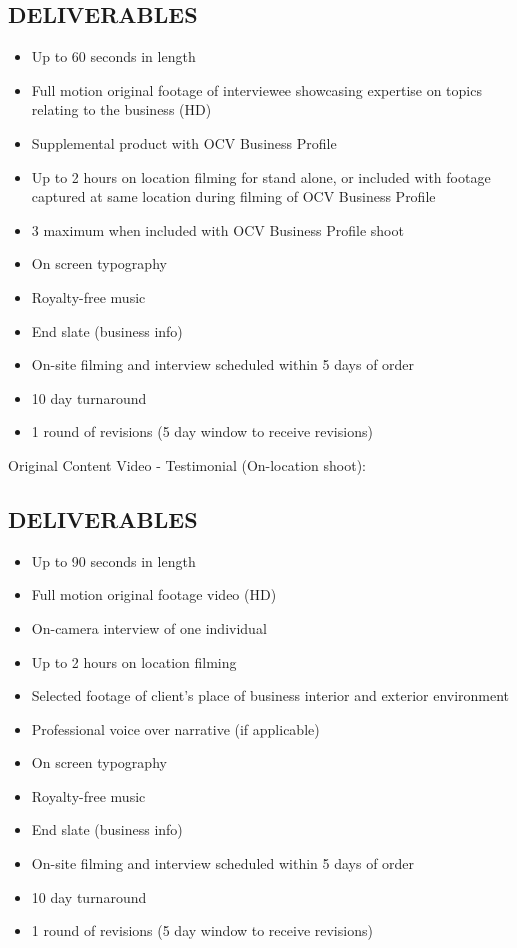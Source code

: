 \documentclass[12pt]{report}
\begin{document}
\subsection{DELIVERABLES}
\begin{itemize}
\item Up to 60 seconds in length
\item Full motion original footage of interviewee showcasing expertise on topics relating to the business (HD)
\item Supplemental product with OCV Business Profile
\item Up to 2 hours on location filming for stand alone, or included with footage captured at same location during filming of OCV Business Profile
\item 3 maximum when included with OCV Business Profile shoot
\item On screen typography
\item Royalty-free music
\item End slate (business info)
\item On-site filming and interview scheduled within 5 days of order
\item 10 day turnaround
\item 1 round of revisions (5 day window to receive revisions)
\end{itemize}

\item Original Content Video - Testimonial (On-location shoot):
\subsection{DELIVERABLES}
\begin{itemize}
\item Up to 90 seconds in length
\item Full motion original footage video (HD)
\item On-camera interview of one individual
\item Up to 2 hours on location filming
\item Selected footage of client's place of business interior and exterior environment
\item Professional voice over narrative (if applicable)
\item On screen typography
\item Royalty-free music
\item End slate (business info)
\item On-site filming and interview scheduled within 5 days of order
\item 10 day turnaround
\item 1 round of revisions (5 day window to receive revisions)
\end{itemize}
\end{document}
